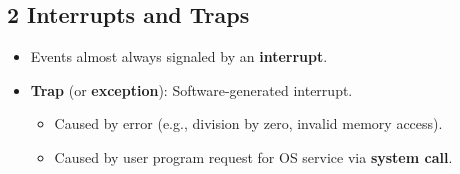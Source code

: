 \documentclass{article}
\begin{document}
\subsection*{2 Interrupts and Traps}
\begin{itemize}
    \item Events almost always signaled by an \textbf{interrupt}.
    \item \textbf{Trap} (or \textbf{exception}): Software-generated interrupt.
    \begin{itemize}
        \item Caused by error (e.g., division by zero, invalid memory access).
        \item Caused by user program request for OS service via \textbf{system call}.
    \end{itemize}
\end{itemize}
\end{document}
